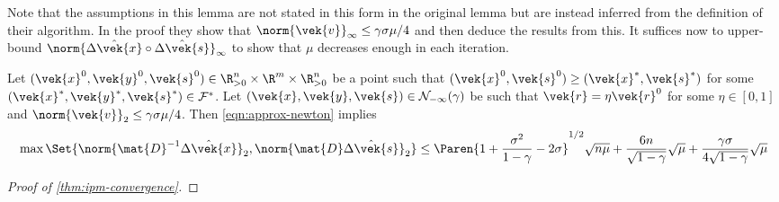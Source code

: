 Note that the assumptions in this lemma are not stated in this form in the original lemma but are instead inferred from the definition of their algorithm.
In the proof they show that \(\norm{\vek{v}}_\infty \leq \gamma \sigma \mu / 4\) and then deduce the results from this.
It suffices now to upper-bound \(\norm{\hat{\Delta\vek{x}} \circ \hat{\Delta\vek{s}}}_\infty\) to show that \(\mu\) decreases enough in each iteration.

\begin{lemma}
  Let \((\vek{x}^0, \vek{y}^0, \vek{s}^0) \in \R^n_{>0} \times \R^m \times \R^n_{>0}\) be a point such that \((\vek{x}^0, \vek{s}^0) \geq (\vek{x}^*, \vek{s}^*)\) for some \((\vek{x}^*, \vek{y}^*, \vek{s}^*) \in \mathcal{F}^*\).
  Let \((\vek{x}, \vek{y}, \vek{s}) \in \mathcal{N}_{-\infty}(\gamma)\) be such that \(\vek{r} = \eta \vek{r}^0\) for some \(\eta \in [0, 1]\) and \(\norm{\vek{v}}_2 \leq \gamma \sigma \mu / 4 \).
  Then \cref{eqn:approx-newton} implies
  \[ \max\Set{\norm{\mat{D}^{-1}\hat{\Delta\vek{x}}}_2, \norm{\mat{D}\hat{\Delta\vek{s}}}_2} \leq \Paren{1 + \frac{\sigma^2}{1- \gamma} - 2\sigma}^{1/2} \sqrt{n \mu} + \frac{6n}{\sqrt{1 - \gamma}} \sqrt{\mu} + \frac{\gamma \sigma}{4 \sqrt{1 - \gamma}}\sqrt{\mu}\]
\end{lemma}

\begin{proof}[Proof of \cref{thm:ipm-convergence}]
    
\end{proof}